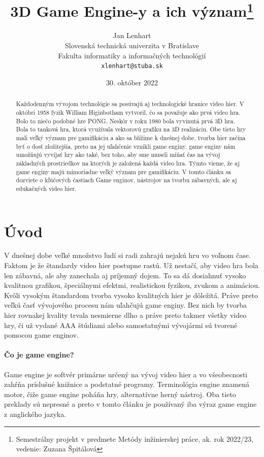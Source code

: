 \documentclass[10pt,oneside,slovak,a4paper,hidelinks]{article}
\title{3D Game Engine-y a ich význam\thanks{Semestrálny projekt v predmete Metódy inžinierskej práce, ak. rok 2022/23, vedenie: Zuzana Špitálová}} %
\author{Jan Lenhart\\[2pt]
	{\small Slovenská technická univerzita v Bratislave}\\
	{\small Fakulta informatiky a informačných technológií}\\
	{\small \texttt{xlenhart@stuba.sk}}
}
\date{\small 30. október 2022} %
\begin{document}
	
	\maketitle
	
	\vspace*{\fill}
	\begin{abstract}
		Každodenným vývojom technológie sa posúvajú aj technologické hranice video hier. V októbri 1958 fyzik William Higinbotham vytvoril, čo sa považuje ako prvá video hra. Bolo to niečo podobné hre PONG. Neskôr v roku 1980 bola vyvinutá prvá 3D hra. Bola to tanková hra, ktorá využívala vektorovú grafiku na 3D realizáciu. Obe tieto hry mali veľký význam pre gamifikáciu a ako sa blížime k dnešnej dobe, tvorba hier začína byť o dosť zložitejšia, preto na jej uľahčenie vznikli game enginy. game enginy nám umožňujú vyvíjať hry ako také, bez toho, aby sme museli míňať čas na vývoj základných prostriedkov na ktorých je založená každá video hra. Týmto vieme, že aj game enginy majú mimoriadne veľký význam pre gamifikáciu. V tomto článku sa dozviete o kľúčových častiach Game enginov, nástrojov na tvorbu zábavných, ale aj edukačných video hier.
	\end{abstract}
	\vspace*{\fill}
	
	\pagebreak
	
	\section{Úvod}
		V dnešnej dobe veľké množstvo ľudí si radi zahrajú nejakú hru vo voľnom čase. Faktom je že štandardy video hier postupne rastú. Už nestačí, aby video hra bola len zábavná, ale aby zanechala aj príjemný dojem. To sa dá dosiahnuť vysoko kvalitnou grafikou, špeciálnymi efektmi, realistickou fyzikou, zvukom a animáciou. Kvôli vysokým štandardom tvorba vysoko kvalitných hier je dôležitá. Práve preto veľkú časť vývojového procesu nám uľahčujú game enginy. Bez nich by tvorba hier rovnakej kvality trvala nesmierne dlho a práve preto takmer všetky video hry, či už vydané AAA štúdiami alebo samostatnými vývojármi sú tvorené pomocou game enginov.
		\paragraph{Čo je game engine?} Game engine je softvér primárne určený na vývoj video hier a vo všeobecnosti zahŕňa príslušné knižnice a podstatné programy. Terminológia engine znamená motor, čiže game engine poháňa hry, alternatívne herný nástroj. Oba tieto preklady sú nepresné a preto v tomto článku je používaný iba výraz game engine z anglického jazyka.
\end{document}
